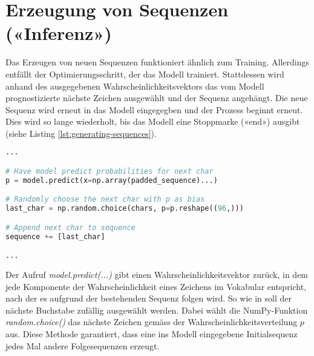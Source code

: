 \section{Erzeugung von Sequenzen («Inferenz»)}
\label{sec:model-generation}

Das Erzeugen von neuen Sequenzen funktioniert ähnlich zum Training.
Allerdings entfällt der Optimierungsschritt, der das Modell trainiert.
Stattdessen wird anhand des ausgegebenen Wahrscheinlichkeitsvektors das vom Modell prognostizierte nächste Zeichen
ausgewählt und der Sequenz angehängt.
Die neue Sequenz wird erneut in das Modell eingegegben und der Prozess beginnt erneut.
Dies wird so lange wiederholt, bis das Modell eine Stoppmarke («end») ausgibt (siehe Listing \ref{lst:generating-sequences}).

\begin{lstlisting}[language=Python, caption=Erzeugung von Sequenzen, label=lst:generating-sequences]
...

# Have model predict probabilities for next char
p = model.predict(x=np.array(padded_sequence)...)

# Randomly choose the next char with p as bias
last_char = np.random.choice(chars, p=p.reshape((96,)))

# Append next char to sequence
sequence += [last_char]

...
\end{lstlisting}

Der Aufruf \textit{model.predict(...)} gibt einen Wahrscheinlichkeitsvektor zurück, in dem jede Komponente der Wahrscheinlichkeit eines Zeichens im Vokabular entspricht,
nach der es aufgrund der bestehenden Sequenz folgen wird.
So wie in \autocite{dabbura} soll der nächste Buchstabe zufällig ausgewählt werden.
Dabei wählt die NumPy-Funktion \textit{random.choice()} das nächste Zeichen gemäss der Wahrscheinlichkeitsverteilung $ p $ aus.
Diese Methode garantiert, dass eine ins Modell eingegebene Initialsequenz jedes Mal andere Folgesequenzen erzeugt.
